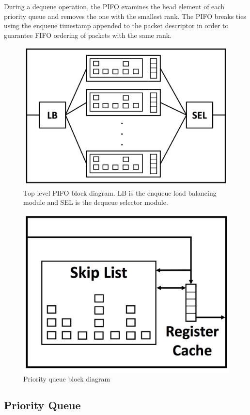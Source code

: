 During a dequeue operation, the PIFO examines the head element of each priority queue and removes the one with the smallest rank. The PIFO breaks ties using the enqueue timestamp appended to the packet descriptor in order to guarantee FIFO ordering of packets with the same rank.

\begin{figure}[!ht]
\includegraphics[width=0.8\linewidth]{figures/design/pifo-top}
\caption{Top level PIFO block diagram. LB is the enqueue load balancing module and SEL is the dequeue selector module.}
\label{fig:pifo-top}
\end{figure}

\begin{figure}[!ht]
\includegraphics[width=0.7\linewidth]{figures/design/priority-queue}
\caption{Priority queue block diagram}
\label{fig:priority-queue}
\end{figure}

\subsection{Priority Queue}\label{sec:priority-queue}

